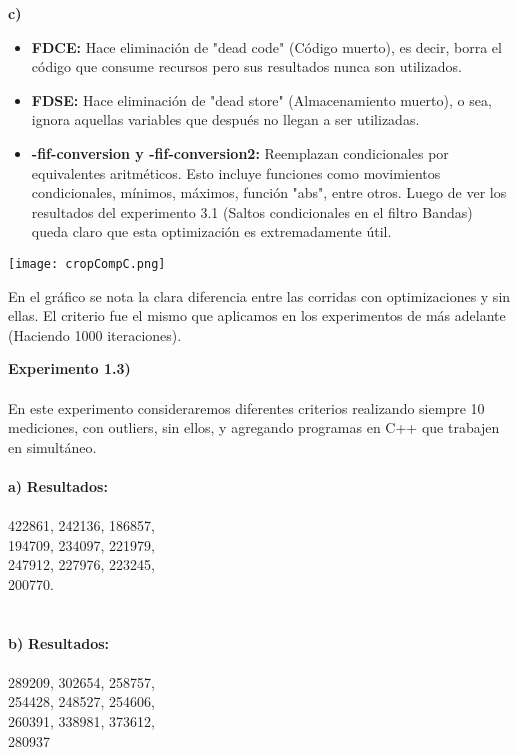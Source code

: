 \documentclass[a4paper]{article}
\begin{document}
\noindent \textbf{c)}\\

\begin{itemize}

	\item \textbf{FDCE:} Hace eliminaci\'{o}n de "dead code" (C\'{o}digo muerto), es decir, borra el c\'{o}digo que consume recursos pero sus resultados nunca son utilizados.
	\item \textbf{FDSE:} Hace eliminaci\'{o}n de "dead store" (Almacenamiento muerto), o sea, ignora aquellas variables que despu\'{e}s no llegan a ser utilizadas. 
	\item \textbf{-fif-conversion y -fif-conversion2:} Reemplazan condicionales por equivalentes aritm\'{e}ticos. Esto incluye funciones como movimientos condicionales, m\'{i}nimos, m\'{a}ximos, funci\'{o}n "abs", entre otros. Luego de ver los resultados del experimento 3.1 (Saltos condicionales en el filtro Bandas) queda claro que esta optimizaci\'{o}n es extremadamente \'{u}til.

\end{itemize}

\texttt{[image: cropCompC.png]}

En el gr\'{a}fico se nota la clara diferencia entre las corridas con optimizaciones y sin ellas. El criterio fue el mismo que aplicamos en los experimentos de m\'{a}s adelante (Haciendo 1000 iteraciones).

\newpage

\textbf{Experimento 1.3)}\\ \\ 
En este experimento consideraremos diferentes criterios realizando siempre 10 mediciones, con outliers, sin ellos, y agregando programas en C++ que trabajen en simult\'{a}neo.\\ \\

\noindent \textbf{a)} \indent \textbf{Resultados:}\\ \\ 422861, 242136, 186857,\\ 194709, 234097, 221979,\\ 247912, 227976, 223245,\\ 200770.\\ \\ \\

\noindent\textbf{b)} \indent \textbf{Resultados:}\\ \\ 289209, 302654, 258757,\\ 254428, 248527, 254606,\\ 260391, 338981, 373612,\\ 280937 \\ \\ \\
\end{document}
